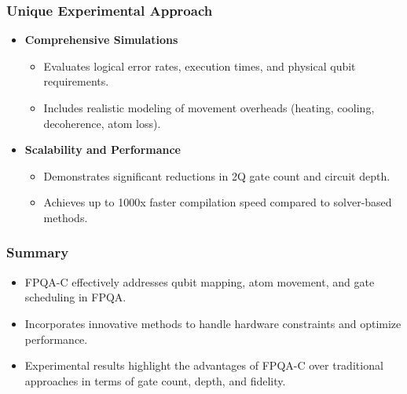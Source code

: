 \documentclass[18 pt]{beamer}
\begin{document}
\begin{frame}
    \frametitle{Unique Experimental Approach}
    \begin{itemize}
        \item \textbf{Comprehensive Simulations}
        \begin{itemize}
            \item Evaluates logical error rates, execution times, and physical qubit requirements.
            \item Includes realistic modeling of movement overheads (heating, cooling, decoherence, atom loss).
        \end{itemize}
        \item \textbf{Scalability and Performance}
        \begin{itemize}
            \item Demonstrates significant reductions in 2Q gate count and circuit depth.
            \item Achieves up to 1000x faster compilation speed compared to solver-based methods.
        \end{itemize}
    \end{itemize}
\end{frame}

\begin{frame}
    \frametitle{Summary}
    \begin{itemize}
        \item FPQA-C effectively addresses qubit mapping, atom movement, and gate scheduling in FPQA.
        \item Incorporates innovative methods to handle hardware constraints and optimize performance.
        \item Experimental results highlight the advantages of FPQA-C over traditional approaches in terms of gate count, depth, and fidelity.
    \end{itemize}
\end{frame}
\end{document}
